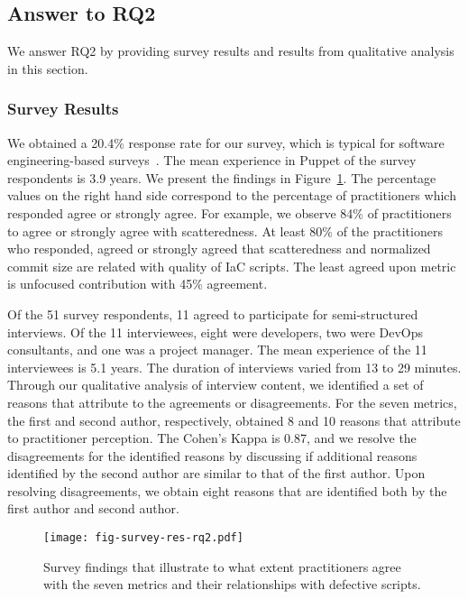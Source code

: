 \documentclass[smallextended]{svjour3}       %
\begin{document}
\subsection{Answer to RQ2}
\label{res-rq2} 

We answer RQ2 by providing survey results and results from qualitative analysis in this section. 

\subsubsection{Survey Results}
\label{res-rq2-survey} 

We obtained a 20.4\% response rate for our survey, which is typical for software engineering-based surveys~\citep{smith:chase2013:survey}. The mean experience in Puppet of the survey respondents is 3.9 years. We present the findings in Figure~\ref{fig-survey-res-rq1}. The percentage values on the right hand side correspond to the percentage of practitioners which responded agree or strongly agree. For example, we observe 84\% of practitioners to agree or strongly agree with scatteredness. At least 80\% of the practitioners who responded, agreed or strongly agreed that scatteredness and normalized commit size are related with quality of IaC scripts. The least agreed upon metric is unfocused contribution with 45\% agreement.       

Of the 51 survey respondents, 11 agreed to participate for semi-structured interviews. Of the 11 interviewees, eight were developers, two were DevOps consultants, and one was a project manager. The mean experience of the 11 interviewees is 5.1 years. The duration of interviews varied from 13 to 29 minutes. Through our qualitative analysis of interview content, we identified a set of reasons that attribute to the agreements or disagreements. For the seven metrics, the first and second author, respectively, obtained 8 and 10 reasons that attribute to practitioner perception. The Cohen's Kappa is 0.87, and we resolve the disagreements for the identified reasons by discussing if additional reasons identified by the second author are similar to that of the first author. Upon resolving disagreements, we obtain eight reasons that are identified both by the first author and second author.   

\begin{figure}[]
\centering
\texttt{[image: fig-survey-res-rq2.pdf]}
\caption{Survey findings that illustrate to what extent practitioners agree with the seven metrics and their relationships with defective scripts.} 
\label{fig-survey-res-rq1}
\end{figure}
\end{document}
